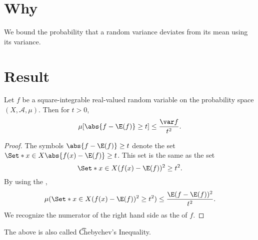 
\section*{Why}

We bound the probability that a random variance deviates from its mean using its variance.

\section*{Result}

\begin{proposition}
Let $f$ be a square-integrable real-valued random variable on the probability space $(X, \mathcal{A} , \mu )$.
Then for $t > 0$,
\[
\mu [\abs{f - \E (f)} \geq t] \leq \frac{\var f}{t^2}.
\]
\begin{proof}The symbols $\abs{f - \E (f)} \geq t$ denote the set $\Set*{x \in X}{ \abs{f(x) - \E (f)} \geq t}$.
This set is the same as the set
\[
\Set*{x \in X}{({f(x) - \E (f)})^2 \geq t^2}.
\]
By using the ,
\[
\mu (\Set*{x \in X}{({f(x) - \E (f)})^2 \geq t^2}) \leq \frac{\E (f - \E (f))^2}{t^2}.
\]
We recognize the numerator of the right hand side as the of $f$.\end{proof}
\end{proposition}

The above is also called \t{Chebychev's Inequality}.

\blankpage